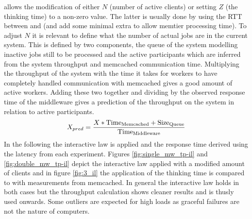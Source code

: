         allows the modification of either $N$ (number of active clients) or setting $Z$ (the thinking time) to a
        non-zero value. The latter is usually done by using the RTT between \srv{} and \mw{} (and add some minimal extra to
        allow memtier processing time). To adjust $N$ it is relevant
        to define what the number of actual jobs are in the current system. This is defined by two components, the queue
        of the system modelling inactive jobs still to be processed and the active participants which are inferred from
        the system throughput and memcached communication time. Multiplying the throughput of the system with the time
        it takes for workers to have completely handled communication with memcached gives a good amount of active
        workers. Adding these two together and dividing by the observed response time of the middleware gives a
        prediction of the throughput on the system in relation to active participants.
        $$
        X_{pred} = \frac{X * \text{Time\textsubscript{Memcached}} +
                   \text{Size\textsubscript{Queue}}}{\text{Time\textsubscript{Middleware}}}
        $$
        In the following the interactive law is applied and the response time derived using the latency from each
        experiment. Figures \ref{fig:single_mw_tp-il} and \ref{fig:double_mw_tp-il} depict the interactive law applied
        with a modified amount of clients and in figure \ref{fig:3_il} the application of the thinking time is compared
        to with measurements from memcached. In general the interactive law holds in both cases but the throughput
        calculation shows cleaner results and is thusly used onwards. Some outliers are expected for high loads as
        graceful failures are not the nature of computers.


